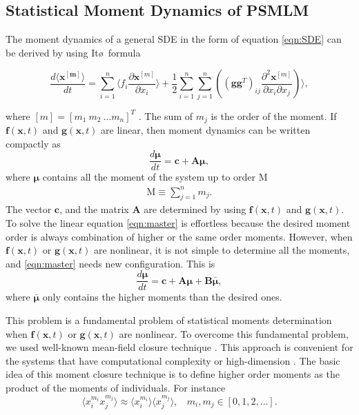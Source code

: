 \documentclass[letterpaper, 10 pt, conference]{ieeeconf}  %
\begin{document}
\subsection{Statistical Moment Dynamics of PSMLM}
The moment dynamics of a general SDE in the form of equation \eqref{eqn:SDE} can be derived by using It\o \ formula
\begin{small}
\begin{equation}
\frac{d\langle \boldsymbol{x^{[m]}} \rangle}{dt}= \sum_{i=1}^n \bigg \langle f_i \frac{\partial \boldsymbol{x}^{[m]}}{\partial x_i} \bigg \rangle + \frac{1}{2} \sum_{i=1}^n \sum_{j=1}^n \left( (\boldsymbol{g} \boldsymbol{g}^T)_{ij}\frac{\partial^2 \boldsymbol{x}^{[m]}}{\partial x_i \partial x_j} \right) \bigg\rangle,
\label{eqn:Ito}
\end{equation} 
\end{small}
where $[m]=[m_1 \ m_2 \ ... m_n]^T$ \cite{hespanha2005stochastic}.
The sum of $m_j$ is the order of the moment. If $\boldsymbol{f}(\boldsymbol{x},t)$ and $\boldsymbol{g}(\boldsymbol{x},t)$ are linear, then moment dynamics can be written compactly as
\begin{equation}
\frac{d \boldsymbol{\mu}}{dt}=\boldsymbol{c}+\boldsymbol{A \mu},
\label{eqn:master}
\end{equation}
where $\boldsymbol{\mu}$ contains all the moment of the system up to order M 
\begin{gather}
\text{M}\equiv \sum_{j=1}^{n} m_j.
\end{gather}
The vector $\boldsymbol{c}$, and the matrix $\boldsymbol{A}$ are determined by using $\boldsymbol{f}(\boldsymbol{x},t)$ and $\boldsymbol{g}(\boldsymbol{x},t)$. To solve the linear equation \eqref{eqn:master} is effortless because the desired moment order is always combination of higher or the same order moments. However, when $\boldsymbol{f}(\boldsymbol{x},t)$ or $\boldsymbol{g}(\boldsymbol{x},t)$ are nonlinear, it   is not simple to determine all the moments, and \eqref{eqn:master} needs new configuration. This is 
\begin{equation}
\frac{d \boldsymbol{\mu}}{dt}=\boldsymbol{c}+\boldsymbol{A \mu}+\boldsymbol{B \bar{\mu}},
\label{eqn:master2}
\end{equation}
where $\boldsymbol{\bar{\mu}}$ only contains the higher moments than the desired ones.

This problem is a fundamental problem of statistical moments determination when $\boldsymbol{f}(\boldsymbol{x},t)$ or $\boldsymbol{g}(\boldsymbol{x},t)$ are nonlinear. To overcome this fundamental problem, we used well-known mean-field closure technique  \cite{bobbio2008mean, chibbaro2014stochastic}. This approach is convenient for the systems that have computational complexity or high-dimension \cite{vrettas2015variational}. The basic idea of this moment closure technique is to define higher order moments as the product of the moments of individuals. For instance
\begin{equation}
\langle x_i^{m_i} x_j^{m_j} \rangle\approx\langle x_i^{m_i} \rangle \langle x_j^{m_j} \rangle,\ \ \ \  m_i, m_j \in [0, 1, 2, \ldots].
\label{eqn:independency}
\end{equation}
\end{document}
